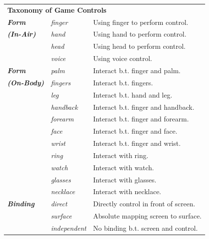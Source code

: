 \documentclass{sigchi}
\newcommand\tabhead[1]{\small\textbf{#1}}
\begin{document}
    \begin{table}
    \centering
    \begin{adjustwidth}{-0.4cm}{}
    \begin{tabular}{|l|l|l|}
      \hline
      \multicolumn{3}{|p{1.06\columnwidth}|}{\centering\tabhead{\textbf{Taxonomy of Game Controls}}}\\
      \Xhline{4\arrayrulewidth}
        \textbf{\em{Form}} & \em{finger} & Using finger to perform control.\\ \cline{2-3} 
        \textbf{\em{{\fontsize{0.3cm}{1em}\selectfont (In-Air)}}}  & \em{hand} & Using hand to perform control.\\ \cline{2-3} 
             & \em{head} & Using head to perform control.\\ \cline{2-3} 
             & \em{voice} & Using voice control.\\ 
      \Xhline{4\arrayrulewidth}
        \textbf{\em{Form}} & \em{palm} & Interact b.t. finger and palm. \\ \cline{2-3} 
        \textbf{\em{{\fontsize{0.3cm}{1em}\selectfont (On-Body)}}} & \em{fingers} & Interact b.t. fingers.\\ \cline{2-3} 
             & \em{leg} & Interact b.t. hand and leg.\\ \cline{2-3} 
             & \em{handback} & Interact b.t. finger and handback.\\ \cline{2-3} 
             & \em{forearm} & Interact b.t. finger and forearm.\\ \cline{2-3} 
             & \em{face} & Interact b.t. finger and face.\\ \cline{2-3} 
             & \em{wrist} & Interact b.t. finger and wrist.\\ \cline{2-3} 
             & \em{ring} & Interact with ring. \\ \cline{2-3} 
             & \em{watch} & Interact with watch.\\ \cline{2-3} 
             & \em{glasses} & Interact with glasses.\\ \cline{2-3} 
             & \em{necklace} & Interact with necklace.\\ 
      \Xhline{4\arrayrulewidth}
        \textbf{\em{Binding}} & \em{direct} & Directly control in front of screen. \\ \cline{2-3} 
             & \em{surface} & Absolute mapping screen to surface.\\ \cline{2-3} 
             & \em{independent} & No binding b.t. screen and control.\\

\end{tabular}
\end{adjustwidth}
\end{table}
\end{document}
